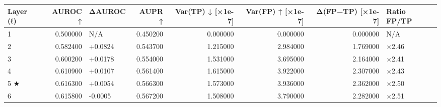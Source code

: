 \begin{tabular}{lrlrrrrl}
\toprule
Layer (ℓ) & AUROC ↑ & ΔAUROC & AUPR ↑ & Var(TP) ↓ [×1e-7] & Var(FP) ↑ [×1e-7] & Δ(FP−TP) [×1e-7] & Ratio FP/TP \\
\midrule
1 & 0.500000 & N/A & 0.450200 & 0.000000 & 0.000000 & 0.000000 & N/A \\
2 & 0.582400 & +0.0824 & 0.543700 & 1.215000 & 2.984000 & 1.769000 & ×2.46 \\
3 & 0.600200 & +0.0178 & 0.554000 & 1.531000 & 3.695000 & 2.164000 & ×2.41 \\
4 & 0.610900 & +0.0107 & 0.561400 & 1.615000 & 3.922000 & 2.307000 & ×2.43 \\
5 ★ & 0.616300 & +0.0054 & 0.566300 & 1.573000 & 3.936000 & 2.362000 & ×2.50 \\
6 & 0.615800 & -0.0005 & 0.567200 & 1.508000 & 3.790000 & 2.282000 & ×2.51 \\
\bottomrule
\end{tabular}
